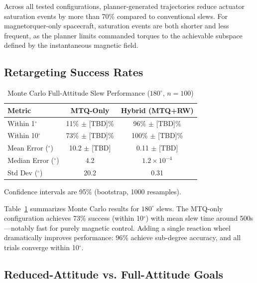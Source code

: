 \documentclass[conference]{IEEEtran}
\begin{document}
Across all tested configurations, planner-generated trajectories reduce actuator saturation events by more than 70\% compared to conventional slews. For magnetorquer-only spacecraft, saturation events are both shorter and less frequent, as the planner limits commanded torques to the achievable subspace defined by the instantaneous magnetic field.

\subsection{Retargeting Success Rates}\label{subsec:retargeting}

\begin{table}[t]
    \centering
    \caption{Monte Carlo Full-Attitude Slew Performance ($180^\circ$, $n=100$)}
    \label{tab:mc_180deg}
    \begin{tabular}{lcc}
        \toprule
        Metric & MTQ-Only & Hybrid (MTQ+RW) \\
        \midrule
        Within 1$^\circ$ & 11\% $\pm$ [TBD]\% & 96\% $\pm$ [TBD]\% \\
        Within 10$^\circ$ & 73\% $\pm$ [TBD]\% & 100\% $\pm$ [TBD]\% \\
        Mean Error ($^\circ$) & 10.2 $\pm$ [TBD] & 0.11 $\pm$ [TBD] \\
        Median Error ($^\circ$) & 4.2 & $1.2\times10^{-4}$ \\
        Std Dev ($^\circ$) & 20.2 & 0.31 \\
        \bottomrule
    \end{tabular}
    \begin{flushleft}
    \small Confidence intervals are 95\% (bootstrap, 1000 resamples).
    \end{flushleft}
\end{table}

Table~\ref{tab:mc_180deg} summarizes Monte Carlo results for $180^\circ$ slews. The MTQ-only configuration achieves 73\% success (within 10$^\circ$) with mean slew time around 500s---notably fast for purely magnetic control. Adding a single reaction wheel dramatically improves performance: 96\% achieve sub-degree accuracy, and all trials converge within 10$^\circ$.

\subsection{Reduced-Attitude vs. Full-Attitude Goals}\label{subsec:reduced_vs_full}
\end{document}

